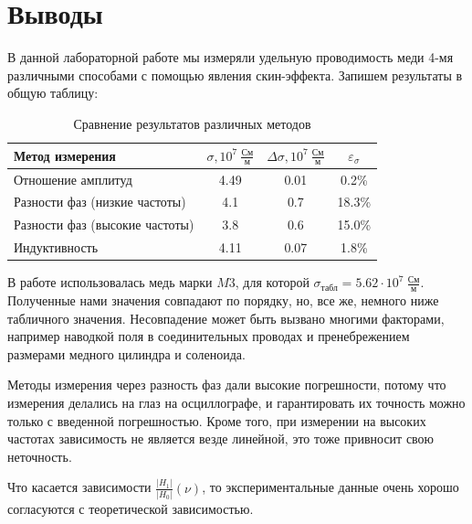\documentclass[a4paper, 12pt]{article}
\begin{document}
	\section*{Выводы}
	В данной лабораторной работе мы измеряли удельную проводимость меди 4-мя различными способами с помощью явления скин-эффекта. Запишем результаты в общую таблицу:
	
	\begin{table}[!h]
		\begin{center}
			\begin{tabular}{|l|c|c|c|}
				\hline
				Метод измерения & $\sigma, 10^{7} \ \frac{\text{См}}{\text{м}}$ & $\Delta\sigma, 10^{7} \ \frac{\text{См}}{\text{м}}$ & $\varepsilon_{\sigma}$\\
				\hline
				Отношение амплитуд & 4.49 & 0.01 & 0.2\%\\ \hline
				Разности фаз (низкие частоты) & 4.1 & 0.7 & 18.3\%\\ \hline
				Разности фаз (высокие частоты) & 3.8 & 0.6 & 15.0\%\\ \hline
				Индуктивность & 4.11 & 0.07 & 1.8\%\\ \hline
				
			\end{tabular}
		\end{center}
		\caption{Сравнение результатов различных методов}\label{}
	\end{table}
	
	В работе использовалась медь марки $M3$, для которой $\sigma_{\text{табл}} = 5.62\cdot10^{7} \ \frac{\text{См}}{\text{м}}$.
	Полученные нами значения совпадают по порядку, но, все же, немного ниже табличного значения. Несовпадение может быть вызвано многими факторами, например наводкой поля в соединительных проводах и пренебрежением размерами медного цилиндра и соленоида. 
	
	Методы измерения через разность фаз дали высокие погрешности, потому что измерения делались на глаз на осциллографе, и гарантировать их точность можно только с введенной погрешностью. Кроме того, при измерении на высоких частотах зависимость не является везде линейной, это тоже привносит свою неточность.
	
	Что касается зависимости $\frac{|H_1|}{|H_0|}(\nu)$, то экспериментальные данные очень хорошо согласуются с теоретической зависимостью.
\end{document}
